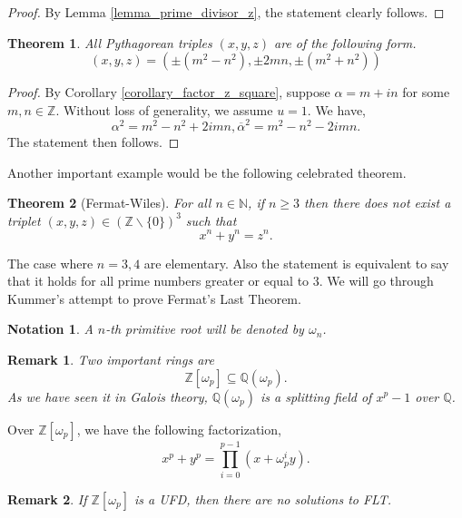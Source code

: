 \documentclass[10pt]{article}
\newtheorem{theorem}{Theorem} [section]
\newtheorem{notation}{Notation}[section]
\newtheorem{remark}{Remark}[section]
\newcommand{\N}[0]{\mathbb{N}}
\newcommand{\Z}[0]{\mathbb{Z}}
\newcommand{\Q}[0]{\mathbb{Q}}
\begin{document}
\begin{proof}
    By Lemma \ref{lemma_prime_divisor_z}, the statement clearly follows. 
\end{proof}
\begin{theorem}
    All Pythagorean triples $(x,y,z)$ are of the following form.
    \begin{equation*}
    (x,y,z) = (\pm(m^2-n^2),\pm2mn,\pm(m^2+n^2))
    \end{equation*}
\end{theorem}
\begin{proof}
    By Corollary \ref{corollary_factor_z_square}, suppose $\alpha = m+in$ for some $m,n\in\Z$. Without loss of generality, we assume $u=1$. We have,
    \begin{equation*}
        \alpha^2 = m^2-n^2+2imn,\overline{\alpha}^2 = m^2-n^2-2imn.
    \end{equation*}
    The statement then follows.
\end{proof}
Another important example would be the following celebrated theorem.
\begin{theorem}[Fermat-Wiles]
    For all $n\in\N$, if $n\geq3$ then there does not exist a triplet $(x,y,z)\in (\Z\backslash\{0\})^3$ such that 
    \begin{equation*}
        x^n+y^n = z^n.
    \end{equation*}
\end{theorem}
The case where $n=3,4$ are elementary. Also the statement is equivalent to say that it holds for all prime numbers greater or equal to $3$. We will go through Kummer's attempt to prove Fermat's Last Theorem.
\begin{notation}
A $n$-th primitive root will be denoted by $\omega_n$. 
\end{notation}
\begin{remark}
    Two important rings are
    \begin{equation*}
        \Z[\omega_p]\subseteq\Q(\omega_p).
    \end{equation*}
    As we have seen it in Galois theory, $\Q(\omega_p)$ is a splitting field of $x^p-1$ over $\Q$.
\end{remark}
Over $\Z[\omega_p]$, we have the following factorization,
\begin{equation*}
    x^p+y^p = \prod_{i=0}^{p-1}(x+\omega_p^iy).
\end{equation*}
\begin{remark}
    If $\Z[\omega_p]$ is a UFD, then there are no solutions to FLT. 
\end{remark}
\end{document}
